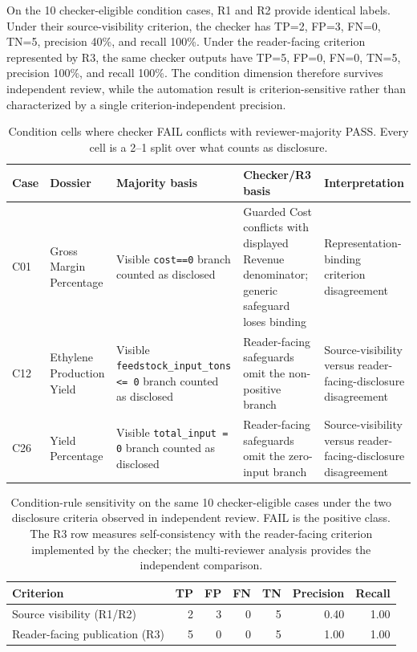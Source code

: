 \documentclass[a4paper,fleqn]{cas-dc}
\begin{document}
On the 10 checker-eligible condition cases, R1 and R2 provide identical labels. Under their source-visibility criterion, the checker has TP=2, FP=3, FN=0, TN=5, precision 40\%, and recall 100\%. Under the reader-facing criterion represented by R3, the same checker outputs have TP=5, FP=0, FN=0, TN=5, precision 100\%, and recall 100\%. The condition dimension therefore survives independent review, while the automation result is criterion-sensitive rather than characterized by a single criterion-independent precision.

\begin{table}[t]
\centering
\caption{Condition cells where checker FAIL conflicts with reviewer-majority PASS. Every cell is a 2--1 split over what counts as disclosure.}
\label{tab:condition_disagreement}
\begin{tabularx}{\textwidth}{@{}llYYY@{}}
\toprule
Case & Dossier & Majority basis & Checker/R3 basis & Interpretation \\
\midrule
C01 & Gross Margin Percentage & Visible \texttt{cost==0} branch counted as disclosed & Guarded Cost conflicts with displayed Revenue denominator; generic safeguard loses binding & Representation-binding criterion disagreement \\
C12 & Ethylene Production Yield & Visible \texttt{feedstock\_\allowbreak{}input\_\allowbreak{}tons <= 0} branch counted as disclosed & Reader-facing safeguards omit the non-positive branch & Source-visibility versus reader-facing-disclosure disagreement \\
C26 & Yield Percentage & Visible \texttt{total\_input = 0} branch counted as disclosed & Reader-facing safeguards omit the zero-input branch & Source-visibility versus reader-facing-disclosure disagreement \\
\bottomrule
\end{tabularx}
\end{table}

\begin{table}[t]
\centering
\caption{Condition-rule sensitivity on the same 10 checker-eligible cases under the two disclosure criteria observed in independent review. FAIL is the positive class. The R3 row measures self-consistency with the reader-facing criterion implemented by the checker; the multi-reviewer analysis provides the independent comparison.}
\label{tab:condition_criteria}
\begin{tabularx}{\textwidth}{@{}Xrrrrrr@{}}
\toprule
Criterion & TP & FP & FN & TN & Precision & Recall \\
\midrule
Source visibility (R1/R2) & 2 & 3 & 0 & 5 & 0.40 & 1.00 \\
Reader-facing publication (R3) & 5 & 0 & 0 & 5 & 1.00 & 1.00 \\
\bottomrule
\end{tabularx}
\end{table}
\end{document}
